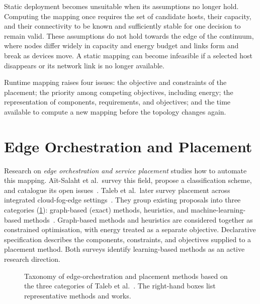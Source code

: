 Static deployment becomes unsuitable when its assumptions no longer hold.
%
Computing the mapping once requires the set of candidate hosts,
their capacity,
and their connectivity to be known and sufficiently stable for one decision to remain valid.
%
These assumptions do not hold towards the edge of the continuum,
where nodes differ widely in capacity and energy budget and links form and break as devices move.
%
A static mapping can become infeasible if a selected host disappears or its network link is no longer available.

Runtime mapping raises four issues:
the objective and constraints of the placement;
the priority among competing objectives, including energy;
the representation of components, requirements, and objectives;
and the time available to compute a new mapping before the topology changes again.

\section{Edge Orchestration and Placement}
\label{sec:edge-orchestration-sota}

Research on \emph{edge orchestration and service placement} studies how to automate this mapping.
%
Aït-Salaht et al.\ survey this field, propose a classification scheme, and catalogue its open issues~\cite{DBLP:journals/csur/Ait-SalahtDL20}.
%
Taleb et al.\ later survey placement across integrated cloud-fog-edge settings~\cite{DBLP:journals/csur/TalebGD25}.
%
They group existing proposals into three categories (\cref{fig:orchestration-taxonomy}):
graph-based (exact) methods,
heuristics,
and machine-learning-based methods~\cite{DBLP:journals/csur/TalebGD25}.
%
Graph-based methods and heuristics are considered together as constrained optimisation,
with energy treated as a separate objective.
%
Declarative specification describes the components, constraints, and objectives supplied to a placement method.
%
Both surveys identify learning-based methods as an active research direction.

\begin{figure}[t]
    \centering
    \resizebox{\textwidth}{!}{}
    \caption[Taxonomy of edge-orchestration and placement methods]{Taxonomy of edge-orchestration and placement methods based on the three categories of Taleb et al.~\cite{DBLP:journals/csur/TalebGD25}. The right-hand boxes list representative methods and works.}
    \label{fig:orchestration-taxonomy}
\end{figure}


